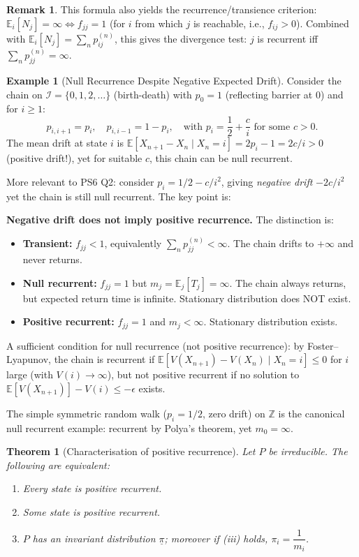 \documentclass[12pt, a4paper]{article}
\theoremstyle{definition}
\newtheorem{example}{Example}[section]
\newtheorem{remark}{Remark}[section]
\theoremstyle{plain}
\newtheorem{theorem}{Theorem}[section]
\newcommand{\EE}{\mathbb{E}}
\newcommand{\II}{\mathcal{I}}
\begin{document}
\begin{remark}
This formula also yields the recurrence/transience criterion: $\EE_i[N_j] = \infty \iff f_{jj} = 1$ (for $i$ from which $j$ is reachable, i.e., $f_{ij} > 0$). Combined with $\EE_i[N_j] = \sum_n p_{ij}^{(n)}$, this gives the divergence test: $j$ is recurrent iff $\sum_n p_{jj}^{(n)} = \infty$.
\end{remark}

\begin{example}[Null Recurrence Despite Negative Expected Drift]
Consider the chain on $\II = \{0, 1, 2, \ldots\}$ (birth-death) with $p_0 = 1$ (reflecting barrier at 0) and for $i \ge 1$:
\[
  p_{i,i+1} = p_i, \quad p_{i,i-1} = 1-p_i, \quad \text{with } p_i = \frac{1}{2} + \frac{c}{i} \text{ for some } c > 0.
\]
The mean drift at state $i$ is $\EE[X_{n+1} - X_n \mid X_n = i] = 2p_i - 1 = 2c/i > 0$ (positive drift!), yet for suitable $c$, this chain can be null recurrent.

More relevant to PS6 Q2: consider $p_i = 1/2 - c/i^2$, giving \emph{negative drift} $-2c/i^2$ yet the chain is still null recurrent. The key point is:

\textbf{Negative drift does not imply positive recurrence.} The distinction is:
\begin{itemize}
  \item \textbf{Transient:} $f_{jj} < 1$, equivalently $\sum_n p_{jj}^{(n)} < \infty$. The chain drifts to $+\infty$ and never returns.
  \item \textbf{Null recurrent:} $f_{jj} = 1$ but $m_j = \EE_j[T_j] = \infty$. The chain always returns, but expected return time is infinite. Stationary distribution does NOT exist.
  \item \textbf{Positive recurrent:} $f_{jj} = 1$ and $m_j < \infty$. Stationary distribution exists.
\end{itemize}
A sufficient condition for null recurrence (not positive recurrence): by Foster--Lyapunov, the chain is recurrent if $\EE[V(X_{n+1}) - V(X_n) \mid X_n = i] \le 0$ for $i$ large (with $V(i) \to \infty$), but not positive recurrent if no solution to $\EE[V(X_{n+1})] - V(i) \le -\epsilon$ exists.

The simple symmetric random walk ($p_i = 1/2$, zero drift) on $\mathbb{Z}$ is the canonical null recurrent example: recurrent by Polya's theorem, yet $m_0 = \infty$.
\end{example}

\begin{theorem}[Characterisation of positive recurrence]
\label{thm:pos-rec}
Let $P$ be irreducible. The following are equivalent:
\begin{enumerate}[label=(\roman*)]
  \item Every state is positive recurrent.
  \item Some state is positive recurrent.
  \item $P$ has an invariant distribution $\underline{\pi}$; moreover if \emph{(iii)} holds, $\pi_i = \dfrac{1}{m_i}$.
\end{enumerate}
\end{theorem}
\end{document}
